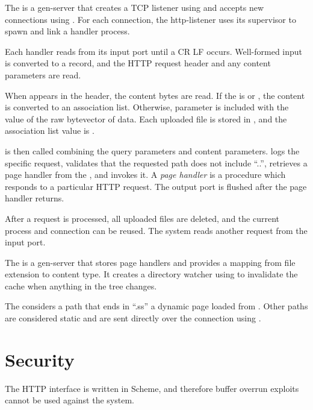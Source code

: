 The  is a gen-server that creates a TCP listener
using  and accepts new connections using
. For each connection, the http-listener uses its
supervisor to spawn and link a handler process.

Each handler reads from its input port until a CR LF
occurs. Well-formed input is converted to a  record,
and the HTTP request header and any content parameters are read.

When  appears in the header, the content bytes
are read. If the  is 
or , the content is
converted to an association list. Otherwise, parameter
 is included with the value of the raw
bytevector of data. Each uploaded file is stored in
, and the association list value is
.

 is then called combining the
 query parameters and content
parameters.  logs the specific request,
validates that the requested path does not include ``..'', retrieves a
page handler from the , and invokes it. A
\emph{page handler} is a procedure which responds to a particular HTTP
request. The output port is flushed after the page handler returns.

After a request is processed, all uploaded files are deleted, and the
current process and connection can be reused. The system reads another
request from the input port.

The  is a gen-server that stores page handlers and
provides a mapping from file extension to content type. It creates a
directory watcher using  to invalidate the
cache when anything in the  tree changes.

The  considers a path that ends in ``.ss'' a
dynamic page loaded from . Other paths are
considered static and are sent directly over the connection using
.

\section {Security}

The HTTP interface is written in Scheme, and therefore buffer overrun
exploits cannot be used against the system.

